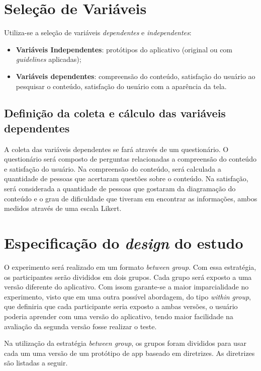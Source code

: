 \documentclass[12pt]{article}
\begin{document}
\section{Seleção de Variáveis}

Utiliza-se a seleção de variáveis \textit{dependentes} e \textit{independentes}:

\begin{itemize}
	\item \textbf{Variáveis Independentes}: protótipos do aplicativo (original ou com \textit{guidelines} aplicadas); 
	\item \textbf{Variáveis dependentes}: compreensão do conteúdo, satisfação do usuário ao pesquisar o conteúdo, satisfação do usuário com a aparência da tela.
\end{itemize}

\subsection{Definição da coleta e cálculo das variáveis dependentes}

A coleta das variáveis dependentes se fará através de um questionário. O questionário será composto de perguntas relacionadas a compreensão do conteúdo e satisfação do usuário. Na compreensão do conteúdo, será calculada a quantidade de pessoas que acertaram questões sobre o conteúdo. Na satisfação, será considerada a quantidade de pessoas que gostaram da diagramação do conteúdo e o grau de dificuldade que tiveram em encontrar as informações, ambos medidos através de uma escala Likert.

\section{Especificação do \textit{design} do estudo}

O experimento será realizado em um formato \textit{between group}. Com essa estratégia, os participantes serão divididos em dois grupos. Cada grupo será exposto a uma versão diferente do aplicativo. Com issom garante-se a maior imparcialidade no experimento, visto que em uma outra possível abordagem, do tipo \textit{within group}, que definiria que cada participante seria exposto a ambas versões, o usuário poderia aprender com uma versão do aplicativo, tendo maior facilidade na avaliação da segunda versão fosse realizar o teste.

Na utilização da estratégia \textit{between group}, os grupos foram divididos para usar cada um uma versão de um protótipo de app baseado em diretrizes. As diretrizes são listadas a seguir.
\end{document}
